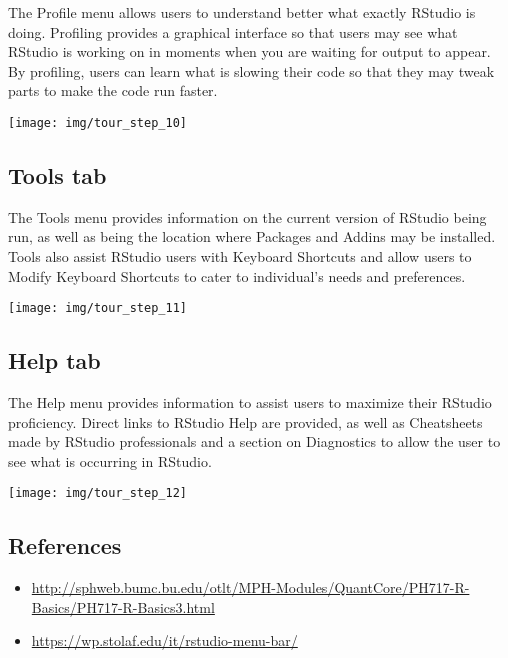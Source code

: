 \documentclass[
]{book}
\providecommand{\tightlist}{%
  \setlength{\itemsep}{0pt}\setlength{\parskip}{0pt}}
\begin{document}
The Profile menu allows users to understand better what exactly RStudio is doing. Profiling provides a graphical interface so that users may see what RStudio is working on in moments when you are waiting for output to appear. By profiling, users can learn what is slowing their code so that they may tweak parts to make the code run faster.

\begin{center}\texttt{[image: img/tour\_step\_10]} \end{center}

\hypertarget{tools-tab}{%
\subsection{Tools tab}\label{tools-tab}}

The Tools menu provides information on the current version of RStudio being run, as well as being the location where Packages and Addins may be installed. Tools also assist RStudio users with Keyboard Shortcuts and allow users to Modify Keyboard Shortcuts to cater to individual's needs and preferences.

\begin{center}\texttt{[image: img/tour\_step\_11]} \end{center}

\hypertarget{help-tab}{%
\subsection{Help tab}\label{help-tab}}

The Help menu provides information to assist users to maximize their RStudio proficiency. Direct links to RStudio Help are provided, as well as Cheatsheets made by RStudio professionals and a section on Diagnostics to allow the user to see what is occurring in RStudio.

\begin{center}\texttt{[image: img/tour\_step\_12]} \end{center}

\hypertarget{references}{%
\subsection{References}\label{references}}

\begin{itemize}
\tightlist
\item
  \url{http://sphweb.bumc.bu.edu/otlt/MPH-Modules/QuantCore/PH717-R-Basics/PH717-R-Basics3.html}
\item
  \url{https://wp.stolaf.edu/it/rstudio-menu-bar/}
\end{itemize}
\end{document}
